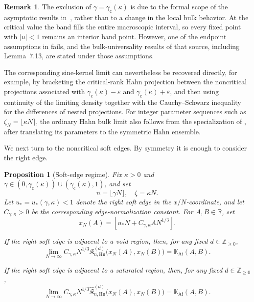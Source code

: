 \documentclass[reqno,11pt]{amsart}
\newcommand{\Khat}{\widehat{\mathfrak{K}}}
\newcommand{\ZZ}{\mathbb{Z}}
\newcommand{\RR}{\mathbb{R}}
\theoremstyle{plain}
\newtheorem{prop}[thm]{Proposition}
\theoremstyle{definition}
\newtheorem{remark}[thm]{Remark}
\numberwithin{equation}{section}
\begin{document}
\begin{remark}\label{rem:Hahn_critical_bulk}
The exclusion of $\gamma=\gamma_{\mathrm c}(\kappa)$ is due to the formal scope of the asymptotic results in~\cite{baik2007discrete}, rather than to a change in the local bulk behavior. At the critical value the band fills the entire macroscopic interval, so every fixed point with $|u|<1$ remains an interior band point. However, one of the endpoint assumptions in \cite[\S2.1.2]{baik2007discrete} fails, and the bulk-universality results of that source, including Lemma~7.13, are stated under those assumptions.

The corresponding sine-kernel limit can nevertheless be recovered directly, for example, by bracketing the critical-rank Hahn projection between the noncritical projections associated with $\gamma_{\mathrm c}(\kappa)-\varepsilon$ and $\gamma_{\mathrm c}(\kappa)+\varepsilon$, and then using continuity of the limiting density together with the Cauchy--Schwarz inequality for the differences of nested projections. For integer parameter sequences such as $\zeta_N=\lfloor\kappa N\rceil$, the ordinary Hahn bulk limit also follows from the specialization of \cite[Theorem~1]{Gorin2008}, after translating its parameters to the symmetric Hahn ensemble. 
\end{remark}

We next turn to the noncritical soft edges. By symmetry it is enough to consider the right edge.

\begin{prop}[Soft-edge regime]
\label{prop:Airy_Hn}
Fix $\kappa>0$ and
$\gamma\in
\left(0,\gamma_{\mathrm c}(\kappa)\right)\cup
\left(\gamma_{\mathrm c}(\kappa),1\right)$,
and set
\[
n=\lfloor\gamma N\rfloor, \quad \zeta=\kappa N.
\]
Let \(u_{\ast}=u_{\ast}(\gamma,\kappa)<1\) denote the right soft edge in the \(x/N\)-coordinate, and let
\(C_{\gamma,\kappa}>0\) be the corresponding edge-normalization constant. For \(A,B\in\RR\), set
\[
x_N(A)
=
\left\lfloor
u_{\ast}N+C_{\gamma,\kappa}A N^{1/3}
\right\rfloor.
\]

If the right soft edge is adjacent to a void region, then, for any fixed \(d\in\ZZ_{\geq0}\),
\[
\lim_{N\to\infty}
C_{\gamma,\kappa}N^{1/3}
\mathfrak K^{(d)}_{n,\mathrm{Hn}}
\bigl(x_N(A),x_N(B)\bigr)
=
\mathbb K_{\mathrm{Ai}}(A,B).
\]

If the right soft edge is adjacent to a saturated region, then, for any fixed \(d\in\ZZ_{\geq0}\),
\[
\lim_{N\to\infty}
C_{\gamma,\kappa}N^{1/3}
\Khat^{(d)}_{n,\mathrm{Hn}}
\bigl(x_N(A), x_N(B)\bigr)
=
\mathbb K_{\mathrm{Ai}}(A,B).
\]
\end{prop}
\end{document}
